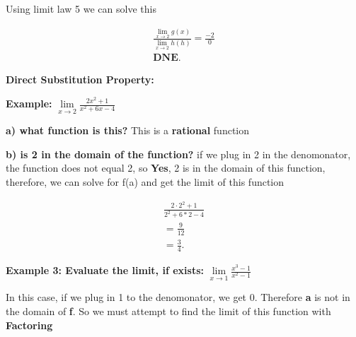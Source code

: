 \documentclass{report}
\begin{document}
    \bigbreak \noindent 
    Using limit law 5 we can solve this

    \begin{align*}
        \frac{ \lim\limits_{x \to 2}{g \left(x\right)}}{ \lim\limits_{x \to 2}{h \left(h\right)}} = \frac{-2}{0} \\
        \textbf{DNE}
    .\end{align*}

    \bigbreak \noindent 
    \begin{large}
       \textbf{Direct Substitution Property:} 
    \end{large}

    \bigbreak \noindent 

    \bigbreak \noindent 
    \begin{large}
       \textbf{Example:} 
       $\lim\limits_{x \to 2}{ \frac{2x^2+1}{x^2+6x-4}}$
    \end{large}

    \bigbreak \noindent \bigbreak \noindent 
    \textbf{a) what function is this?}
    \noindent This is a \textbf{rational} function 


    \bigbreak \noindent \bigbreak \noindent  
    \textbf{b) is 2 in the domain of the function?}
    \noindent if we plug in 2 in the denomonator, the function does not equal 2, 
    so \textbf{Yes}, 2 is in the domain of this function, therefore, we can solve for f(a)
    and get the limit of this function

    \begin{align*}
        \frac{2 \cdot 2^2+1}{2^2+6*2-4} \\
        = \frac{9}{12} \\
        = \frac{3}{4}
    .\end{align*}

    \bigbreak \noindent 
    \begin{large}
       \textbf{Example 3: Evaluate the limit, if exists:} 
        \bigbreak \noindent 
        $\lim\limits_{x \to 1}{ \frac{x^3-1}{x^2-1}}$
    \end{large}
    
   \noindent In this case, if we plug in 1 to the denomonator, we get 0. Therefore \textbf{a} is not in the domain of \textbf{f}. 
   So we must attempt to find the limit of this function with \textbf{Factoring}
\end{document}

